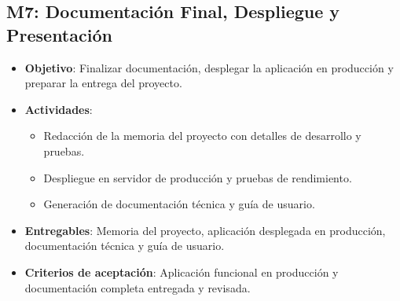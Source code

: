 \subsection{M7: Documentación Final, Despliegue y Presentación}
\begin{itemize}
    \item \textbf{Objetivo}: Finalizar documentación, desplegar la aplicación en producción y preparar la entrega del proyecto.
    \item \textbf{Actividades}:
        \begin{itemize}
            \item Redacción de la memoria del proyecto con detalles de desarrollo y pruebas.
            \item Despliegue en servidor de producción y pruebas de rendimiento.
            \item Generación de documentación técnica y guía de usuario.
        \end{itemize}
    \item \textbf{Entregables}: Memoria del proyecto, aplicación desplegada en producción, documentación técnica y guía de usuario.
    \item \textbf{Criterios de aceptación}: Aplicación funcional en producción y documentación completa entregada y revisada.
\end{itemize}
